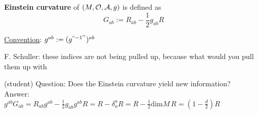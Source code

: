 \begin{definition}
\textbf{Einstein curvature} of $(M, \mathcal{O}, \mathcal{A}, g)$ is defined as
\begin{equation}
\boxed{G_{ab} := R_{ab} - \frac{1}{2} g_{ab} R}
\end{equation}
\end{definition}

\underline{Convention}: $g^{ab} := (g^{``-1''})^{ab}$

F. Schuller: these indices are not being pulled up, because what would you pull them up with

(student) Question: Does the Einstein curvature yield new information? \\
Answer: \\
$g^{ab} G_{ab} = R_{ab} g^{ab} - \frac{1}{2} g_{ab} g^{ab} R = R - \delta^a_a R = R - \frac{1}{2} \text{dim}M \, R = (1- \frac{d}{2}) R$
